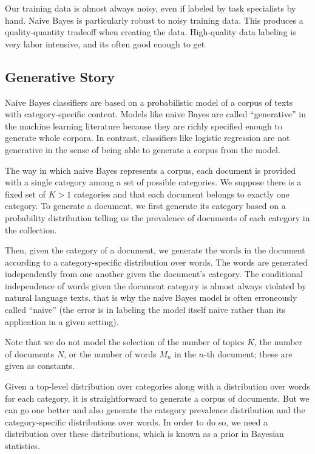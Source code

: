 Our training data is almost always noisy, even if labeled by task
specialists by hand.  Naive Bayes is particularly robust to noisy
training data.  This produces a quality-quantity tradeoff when
creating the data.  High-quality data labeling is very labor
intensive, and its often good enough to get



\subsection{Generative Story}

Naive Bayes classifiers are based on a probabilistic model of a corpus
of texts with category-specific content.  Models like naive Bayes are
called ``generative'' in the machine learning literature because they
are richly specified enough to generate whole corpora.  In contrast,
classifiers like logistic regression are not generative in the sense
of being able to generate a corpus from the model.

The way in which naive Bayes represents a corpus, each document is
provided with a single category among a set of possible categories.
We suppose there is a fixed set of $K > 1$ categories and that each
document belongs to exactly one category.  To generate a document, we
first generate its category based on a probability distribution
telling us the prevalence of documents of each category in the
collection.

Then, given the category of a document, we generate the words in the
document according to a category-specific distribution over words.
The words are generated independently from one another given the
document's category.  The conditional independence of words given the
document category is almost always violated by natural language texts.
that is why the naive Bayes model is often erroneously called
``naive'' (the error is in labeling the model itself naive rather
than its application in a given setting).

Note that we do not model the selection of the number of topics $K$,
the number of documents $N$, or the number of words $M_n$ in the
$n$-th document; these are given as constants.  

Given a top-level distribution over categories along with a
distribution over words for each category, it is straightforward to
generate a corpus of documents.  But we can go one better and also
generate the category prevalence distribution and the
category-specific distributions over words.  In order to do so, we
need a distribution over these distributions, which is known as a
prior in Bayesian statistics.

